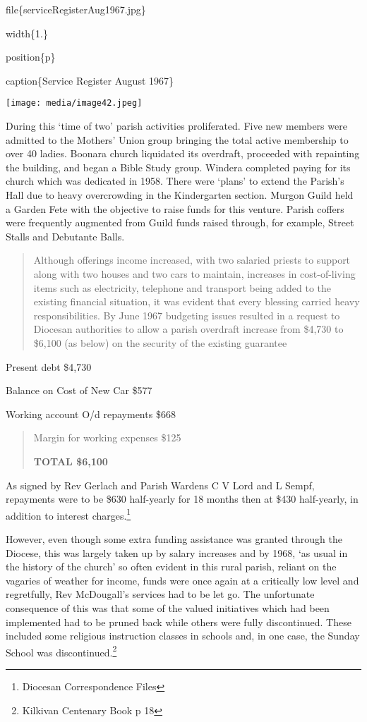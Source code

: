 file\{serviceRegisterAug1967.jpg\}

width\{1.\}

position\{p\}

caption\{Service Register August 1967\}

\texttt{[image: media/image42.jpeg]}

During this `time of two' parish activities proliferated. Five new members were admitted to the Mothers' Union group bringing the total active membership to over 40 ladies. Boonara church liquidated its overdraft, proceeded with repainting the building, and began a Bible Study group. Windera completed paying for its church which was dedicated in 1958. There were `plans' to extend the Parish's Hall due to heavy overcrowding in the Kindergarten section. Murgon Guild held a Garden Fete with the objective to raise funds for this venture. Parish coffers were frequently augmented from Guild funds raised through, for example, Street Stalls and Debutante Balls.

\begin{quote}
Although offerings income increased, with two salaried priests to support along with two houses and two cars to maintain, increases in cost-of-living items such as electricity, telephone and transport being added to the existing financial situation, it was evident that every blessing carried heavy responsibilities. By June 1967 budgeting issues resulted in a request to Diocesan authorities to allow a parish overdraft increase from \$4,730 to \$6,100 (as below) on the security of the existing guarantee
\end{quote}

Present debt \$4,730

Balance on Cost of New Car \$577

Working account O/d repayments \$668

\begin{quote}
Margin for working expenses \$125

\textbf{TOTAL \$6,100}
\end{quote}

As signed by Rev Gerlach and Parish Wardens C V Lord and L Sempf, repayments were to be \$630 half-yearly for 18 months then at \$430 half-yearly, in addition to interest charges.\footnote{Diocesan Correspondence Files}

However, even though some extra funding assistance was granted through the Diocese, this was largely taken up by salary increases and by 1968, `as usual in the history of the church' so often evident in this rural parish, reliant on the vagaries of weather for income, funds were once again at a critically low level and regretfully, Rev McDougall's services had to be let go. The unfortunate consequence of this was that some of the valued initiatives which had been implemented had to be pruned back while others were fully discontinued. These included some religious instruction classes in schools and, in one case, the Sunday School was discontinued.\footnote{Kilkivan Centenary Book p 18}

